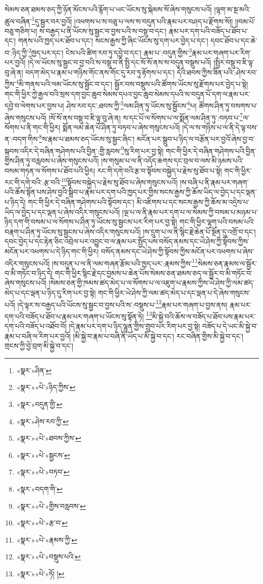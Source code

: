 སེམས་ཅན་ཐམས་ཅད་ཀྱི་ཉོན་མོངས་པའི་རྙོག་པ་ཡང་ཡོངས་སུ་སྐེམས་སོ་ཞེས་གསུངས་པའོ། །ལྷག་མ་སྔ་མའི་ཚུལ་བཞིན་\footnote{«སྣར་»ཤིན་}དུ་སྦྱར་བར་བྱའོ། །འཕགས་པ་ས་བཅུ་པ་ལས་ས་བདུན་པའི་རྣམ་པར་བཤད་པ་རྫོགས་སོ།། །།བམ་པོ་བཅུ་གཅིག་པ། ས་བརྒྱད་པ་ནི་ཡོངས་སུ་སྦྱང་བ་བྱས་པའི་ས་བསྡུ་བ་དང་། རྣམ་པར་དག་པའི་བཟོད་པ་ཐོབ་པ་དང་། གནས་པའི་ཁྱད་པར་ཐོབ་པ་དང་། སངས་རྒྱས་ཀྱི་ཞིང་ཡོངས་སུ་དག་པར་བྱེད་པ་དང་། དབང་ཐོབ་པ་དང་ཆེ་བ་:ཉིད་ཀྱི་\footnote{«སྣར་»«པེ་»ཉིད་ཀྱིས་}ཁྱད་པར་དང་། ངེས་པའི་ཚིག་རབ་ཏུ་དབྱེ་བ་དང་། རྣམ་པ་:བདུན་གྱིས་\footnote{«སྣར་»བདུན་གྱི་}རྣམ་པར་གཞག་པར་རིག་པར་བྱའོ། །དེ་ལ་ཡོངས་སུ་སྦྱང་བ་བྱ་བའི་ས་བསྡུ་བ་ནི་སྤྱི་དང་སོ་སོ་ནས་ས་བདུན་བསྡུས་པའོ། །སྤྱིར་བསྡུ་བ་ཇི་ལྟ་བུ་ཞེ་ན། བདག་མེད་པ་རྣམ་པ་གཉིས་གོང་ནས་གོང་དུ་རབ་ཏུ་རྟོགས་པ་དང་། དེའི་ཐབས་ཀྱིས་ཟིན་པའི་:ཤེས་རབ་ཀྱིས་\footnote{«སྣར་»ཤེས་རབ་ཀྱི་}མི་གནས་པའི་ལམ་ཡོངས་སུ་སྦྱོང་བ་དང་། སྦྱོར་བས་བསྡུས་པའི་ཚོགས་ཡོངས་སུ་རྫོགས་པར་བྱེད་པ་སྟེ། གང་གི་ཕྱིར་ཀྱེ་རྒྱལ་བའི་སྲས་དག་བྱང་ཆུབ་སེམས་དཔའ་བྱང་ཆུབ་སེམས་དཔའི་ས་བདུན་པོ་དག་ལ་རྣམ་པར་དབྱེ་བ་ལེགས་པར་བྱས་པ། ཤེས་རབ་དང་:ཐབས་ཀྱི་\footnote{«སྣར་»«པེ་»ཐབས་ཀྱིས་}ལམ་ཤིན་ཏུ་ཡོངས་སུ་སྦྱོངས་\footnote{«སྣར་»«པེ་»སྦྱངས་}པ། ཚོགས་ཤིན་ཏུ་བསགས་པ་ཞེས་གསུངས་པའོ། །སོ་སོ་ནས་བསྡུ་བ་ཇི་ལྟ་བུ་ཞེ་ན། ས་དང་པོ་ལ་སོགས་པ་ལ་སྨོན་ལམ་ཤིན་ཏུ་:བཏབ་པ་\footnote{«སྣར་»«པེ་»བཏབ་}ལ་སོགས་པ་ནི་གང་གི་ཕྱིར། སྨོན་ལམ་ཆེན་པོ་ཤིན་ཏུ་བཏབ་པ་ཞེས་གསུངས་པའོ། །དེ་ལ་ས་གཉིས་པ་ལ་ནི་དེ་ལྟ་བས་ན་:བདག་གིས་\footnote{«སྣར་»བདག་གི་}ས་རྣམ་པ་ཐམས་ཅད་ཡོངས་སུ་སྦྱང་ཞིང་། མངོན་པར་སྒྲུབ་པ་ཉིད་ལ་བརྩོན་པར་བྱའོ་ཞེས་བྱ་བ་སྐབས་འདིར་དེ་བཞིན་གཤེགས་པའི་བྱིན་:གྱི་རླབས་\footnote{«སྣར་»«པེ་»གྱིས་བརླབས་}སུ་རིག་པར་བྱ་སྟེ། གང་གི་ཕྱིར་དེ་བཞིན་གཤེགས་པའི་བྱིན་གྱིས་ཤིན་ཏུ་བརླབས་པ་ཞེས་གསུངས་པའོ། །ས་གསུམ་པ་ལ་ནི་འདོད་ཆགས་དང་བྲལ་བ་ལས་མི་ཉམས་པའི་བསམ་གཏན་ལ་སོགས་པ་ཐོབ་པའི་ཕྱིར། རང་གི་དགེ་བའི་རྩ་བ་སྟོབས་བསྐྱེད་པ་རྗེས་སུ་ཐོབ་པ་སྟེ། གང་གི་ཕྱིར་རང་གི་དགེ་བའི་:རྩ་བའི་\footnote{«སྣར་»«པེ་»རྩ་བ་}སྟོབས་བསྐྱེད་པ་རྗེས་སུ་ཐོབ་པ་ཞེས་གསུངས་པའོ། །ས་བཞི་པ་ནི་རྣམ་པར་གཞག་པའི་ཆོས་སྟོན་པས་ཤེས་བྱའི་སྒྲིབ་པ་རྣམ་པར་དག་པའི་ཁྱད་པར་གྱིས་སངས་རྒྱས་ཀྱི་ཆོས་ཡིད་ལ་བྱེད་པ་དང་ལྡན་པ་ཉིད་དེ། གང་གི་ཕྱིར་དེ་བཞིན་གཤེགས་པའི་སྟོབས་དང་། མི་འཇིགས་པ་དང་སངས་རྒྱས་ཀྱི་ཆོས་མ་འདྲེས་པ་ཡིད་ལ་བྱེད་པ་དང་ལྡན་པ་ཞེས་འདིར་གསུངས་པའོ། །ལྔ་པ་ལ་ནི་རྣམ་པར་དག་པ་ལ་སེམས་ཀྱི་བསམ་པ་མཉམ་པ་ཉིད་དག་གི་བསམ་པ་ལ་སོགས་པ་ཤིན་ཏུ་ཡོངས་སུ་སྦྱངས་པར་རིག་པར་བྱ་སྟེ། གང་གི་ཕྱིར་ལྷག་པའི་བསམ་པའི་བརྣག་པ་ཤིན་ཏུ་ཡོངས་སུ་སྦྱངས་པ་ཞེས་འདིར་གསུངས་པའོ། །ས་དྲུག་པ་ལ་ནི་སྙིང་རྗེ་ཆེན་པོ་སྔོན་དུ་འགྲོ་བ་དང་། དབང་བྱེད་པ་དང་རྟེན་ཅིང་འབྲེལ་པར་འབྱུང་བ་ལ་རྣམ་པར་སྤྱོད་པས་བསོད་ནམས་དང་ཡེ་ཤེས་ཀྱི་སྟོབས་ཀྱིས་མངོན་པར་འཕགས་པ་དེ་ཉིད་གང་གི་ཕྱིར། བསོད་ནམས་དང་ཡེ་ཤེས་ཀྱི་སྟོབས་ཀྱིས་མངོན་པར་འཕགས་པ་ཞེས་འདིར་གསུངས་པའོ། །ས་བདུན་པ་ལ་ནི་ལམ་གཞན་རྩོམ་པའི་ཁྱད་པར་:རྣམས་ཀྱིས་\footnote{«སྣར་»«པེ་»རྣམས་ཀྱི་}སེམས་ཅན་རྣམས་ལ་སྦྱོར་བ་མི་གཏོང་བ་ཉིད་དེ། གང་གི་ཕྱིར་སྙིང་རྗེ་དང་བྱམས་པ་ཆེན་པོས་སེམས་ཅན་ཐམས་ཅད་ལ་སྦྱོར་བ་མི་གཏོང་བ་ཞེས་གསུངས་པའོ། །སེམས་ཅན་གྱི་ཁམས་ཚད་མེད་པ་ལ་སོགས་པ་ལ་འཇུག་པ་རྣམས་ཀྱིས་ཡེ་ཤེས་ཀྱི་ལམ་ཚད་མེད་པ་དང་ལྡན་པ་ཉིད་དུ་རིག་པར་བྱ་སྟེ། གང་གི་ཕྱིར་ཡེ་ཤེས་ཀྱི་ལམ་ཚད་མེད་པ་དང་ལྡན་པ་དེ་ཞེས་གསུངས་པའོ། །དེ་ལྟར་ས་བརྒྱད་པའི་ཡོངས་སུ་སྦྱང་བ་བྱས་པའི་ས་:བསྡུས་པ་\footnote{«སྣར་»«པེ་»བསྡུས་པའི་}རྣམ་པར་གཞག་པ་བྱས་ནས། རྣམ་པར་དག་པའི་བཟོད་པ་ཐོབ་པ་རྣམ་པར་གཞག་པ་ཡོངས་སུ་སྟོན་ཏེ། \footnote{«སྣར་»«པེ་»ཏོ། ། }མི་སྐྱེ་བའི་ཆོས་ལ་བཟོད་པ་ཐོབ་པས་རྣམ་པར་དག་པའི་བཟོད་པ་འཐོབ་བོ། །དེ་རྣམ་པར་དག་པ་ཉིད་ལྷུན་གྱིས་གྲུབ་པར་རིག་པར་བྱ་སྟེ། བཟོད་པ་དེ་ཡང་མི་སྐྱེ་བ་རྣམ་པ་བཞི་ལ་རིག་པར་བྱའོ། །མི་སྐྱེ་བ་རྣམ་པ་བཞི་ནི་ཡོད་པ་མི་སྐྱེ་བ་དང་། རང་བཞིན་གྱིས་མི་སྐྱེ་བ་དང་། གྲངས་ཀྱི་བྱེ་བྲག་མི་སྐྱེ་བ་དང་། 